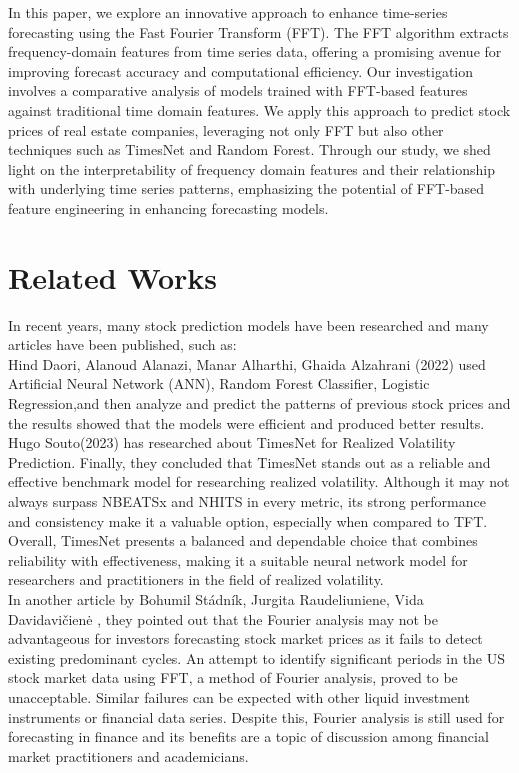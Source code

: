 \documentclass{ieeeojies}
\begin{document}
In this paper, we explore an innovative approach to enhance time-series forecasting using the Fast Fourier Transform (FFT). The FFT algorithm extracts frequency-domain features from time series data, offering a promising avenue for improving forecast accuracy and computational efficiency. Our investigation involves a comparative analysis of models trained with FFT-based features against traditional time domain features. We apply this approach to predict stock prices of real estate companies, leveraging not only FFT but also other techniques such as TimesNet and Random Forest. Through our study, we shed light on the interpretability of frequency domain features and their relationship with underlying time series patterns, emphasizing the potential of FFT-based feature engineering in enhancing forecasting models.

\section{Related Works}

In recent years, many stock prediction models have been researched and many articles have been published, such as: \\

Hind Daori, Alanoud Alanazi, Manar Alharthi, Ghaida Alzahrani (2022)\cite{b1} used Artificial Neural Network (ANN), Random Forest
Classifier, Logistic Regression,and then analyze and predict the
patterns of previous stock prices and the results showed that the models were efficient and produced better results.\\

Hugo Souto(2023) \cite{b2} has researched about TimesNet for Realized Volatility Prediction. Finally, they concluded that TimesNet stands out as a reliable and effective benchmark model for researching realized volatility. Although it may not always surpass NBEATSx and NHITS in every metric, its strong performance and consistency make it a valuable option, especially when compared to TFT. Overall, TimesNet presents a balanced and dependable choice that combines reliability with effectiveness, making it a suitable neural network model for researchers and practitioners in the field of realized volatility. \\

In another article by Bohumil Stádník, Jurgita Raudeliuniene, Vida Davidavičienė \cite{b3}, they pointed out that the Fourier analysis may not be advantageous for investors forecasting stock market prices as it fails to detect existing predominant cycles. An attempt to identify significant periods in the US stock market data using FFT, a method of Fourier analysis, proved to be unacceptable. Similar failures can be expected with other liquid investment instruments or financial data series. Despite this, Fourier analysis is still used for forecasting in finance and its benefits are a topic of discussion among financial market practitioners and academicians.
\end{document}
